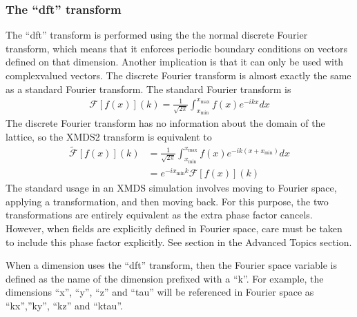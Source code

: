 \documentclass[letterpaper,10pt,english]{sphinxmanual}
\begin{document}
\ignorespaces 

\subsubsection{The “dft” transform}
\label{\detokenize{reference_elements:the-dft-transform}}\label{\detokenize{reference_elements:dft-transform}}\label{\detokenize{reference_elements:index-33}}
\ignorespaces 
\sphinxAtStartPar
The “dft” transform is performed using the the normal discrete Fourier transform, which means that it enforces periodic boundary conditions on vectors defined on that dimension.  Another implication is that it can only be used with complex\sphinxhyphen{}valued vectors.  The discrete Fourier transform is almost exactly the same as a standard Fourier transform.  The standard Fourier transform is
\begin{equation*}
\begin{split}\mathcal{F}\left[f(x)\right](k) = \frac{1}{\sqrt{2\pi}}\int_{x_\text{min}}^{x_\text{max}} f(x) e^{-i k x} dx\end{split}
\end{equation*}
\sphinxAtStartPar
The discrete Fourier transform has no information about the domain of the lattice, so the XMDS2 transform is equivalent to
\begin{equation*}
\begin{split}\tilde{\mathcal{F}}\left[f(x)\right](k) &= \frac{1}{\sqrt{2\pi}}\int_{x_\text{min}}^{x_\text{max}} f(x) e^{-i k (x+ x_\text{min})} dx \\
&= e^{-i x_\text{min} k} \mathcal{F}\left[f(x)\right](k)\end{split}
\end{equation*}
\sphinxAtStartPar
The standard usage in an XMDS simulation involves moving to Fourier space, applying a transformation, and then moving back.  For this purpose, the two transformations are entirely equivalent as the extra phase factor cancels.  However, when fields are explicitly defined in Fourier space, care must be taken to include this phase factor explicitly.  See section {\hyperref[\detokenize{advanced_topics:convolutions}]{}} in the Advanced Topics section.

\sphinxAtStartPar
When a dimension uses the “dft” transform, then the Fourier space variable is defined as the name of the dimension prefixed with a “k”.  For example, the dimensions “x”, “y”, “z” and “tau” will be referenced in Fourier space as “kx”,”ky”, “kz” and “ktau”.
\end{document}

